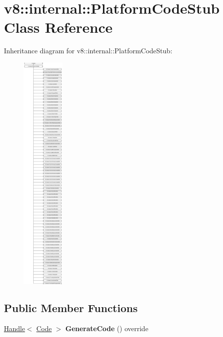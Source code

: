 \hypertarget{classv8_1_1internal_1_1_platform_code_stub}{}\section{v8\+:\+:internal\+:\+:Platform\+Code\+Stub Class Reference}
\label{classv8_1_1internal_1_1_platform_code_stub}
Inheritance diagram for v8\+:\+:internal\+:\+:Platform\+Code\+Stub\+:\begin{figure}[H]
\begin{center}
\leavevmode
\includegraphics[height=12.000000cm]{classv8_1_1internal_1_1_platform_code_stub}
\end{center}
\end{figure}
\subsection*{Public Member Functions}
\begin{DoxyCompactItemize}
\item 
\hyperlink{classv8_1_1internal_1_1_handle}{Handle}$<$ \hyperlink{classv8_1_1internal_1_1_code}{Code} $>$ {\bfseries Generate\+Code} () override\hypertarget{classv8_1_1internal_1_1_platform_code_stub_ae469c434536ffe2754b075a0a6956733}{}\label{classv8_1_1internal_1_1_platform_code_stub_ae469c434536ffe2754b075a0a6956733}

\end{DoxyCompactItemize}
